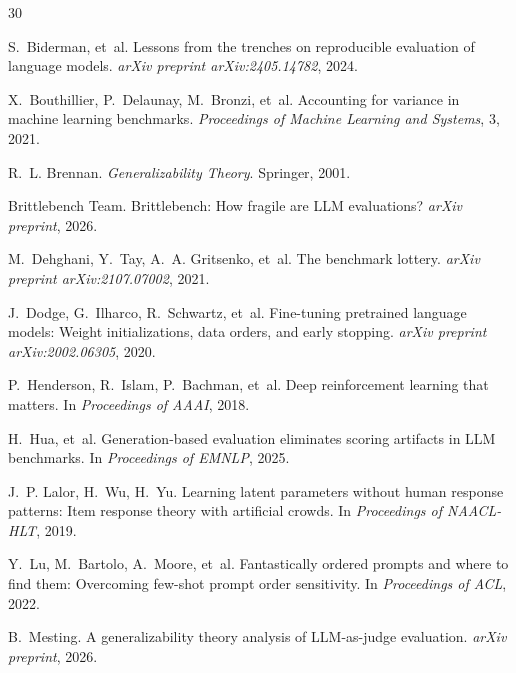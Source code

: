 \documentclass[11pt]{article}
\begin{document}
\begin{thebibliography}{30}

S.~Biderman, et~al.
\newblock Lessons from the trenches on reproducible evaluation of language models.
\newblock \emph{arXiv preprint arXiv:2405.14782}, 2024.

X.~Bouthillier, P.~Delaunay, M.~Bronzi, et~al.
\newblock Accounting for variance in machine learning benchmarks.
\newblock \emph{Proceedings of Machine Learning and Systems}, 3, 2021.

R.~L. Brennan.
\newblock \emph{Generalizability Theory}.
\newblock Springer, 2001.

Brittlebench Team.
\newblock Brittlebench: How fragile are LLM evaluations?
\newblock \emph{arXiv preprint}, 2026.

M.~Dehghani, Y.~Tay, A.~A. Gritsenko, et~al.
\newblock The benchmark lottery.
\newblock \emph{arXiv preprint arXiv:2107.07002}, 2021.

J.~Dodge, G.~Ilharco, R.~Schwartz, et~al.
\newblock Fine-tuning pretrained language models: Weight initializations, data orders, and early stopping.
\newblock \emph{arXiv preprint arXiv:2002.06305}, 2020.

P.~Henderson, R.~Islam, P.~Bachman, et~al.
\newblock Deep reinforcement learning that matters.
\newblock In \emph{Proceedings of AAAI}, 2018.

H.~Hua, et~al.
\newblock Generation-based evaluation eliminates scoring artifacts in LLM benchmarks.
\newblock In \emph{Proceedings of EMNLP}, 2025.

J.~P. Lalor, H.~Wu, H.~Yu.
\newblock Learning latent parameters without human response patterns: Item response theory with artificial crowds.
\newblock In \emph{Proceedings of NAACL-HLT}, 2019.

Y.~Lu, M.~Bartolo, A.~Moore, et~al.
\newblock Fantastically ordered prompts and where to find them: Overcoming few-shot prompt order sensitivity.
\newblock In \emph{Proceedings of ACL}, 2022.

B.~Mesting.
\newblock A generalizability theory analysis of LLM-as-judge evaluation.
\newblock \emph{arXiv preprint}, 2026.


\end{thebibliography}
\end{document}
